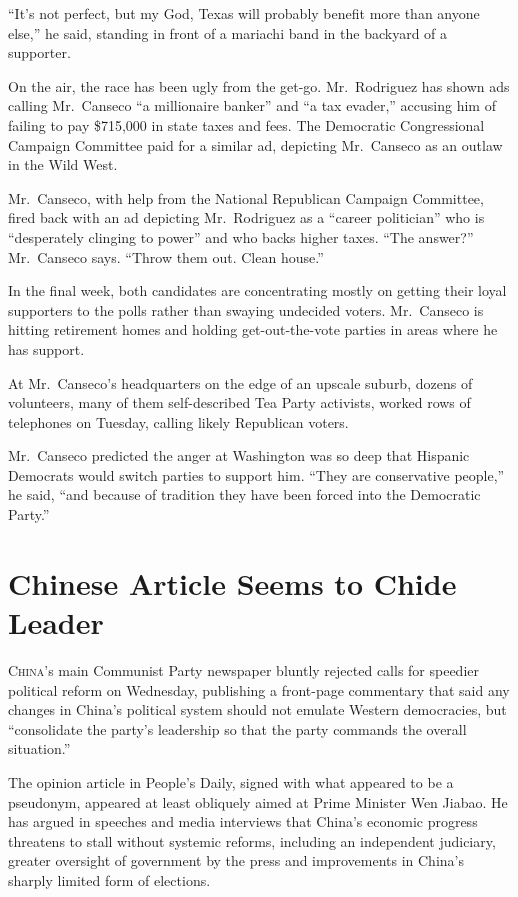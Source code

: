 ﻿\documentclass[12pt]{article}
\begin{document}
``It's not perfect, but my God, Texas will probably benefit more than anyone else,'' he said,
standing in front of a mariachi band in the backyard of a supporter.

On the air, the race has been ugly from the get-go. Mr.~Rodriguez has shown ads calling Mr.~Canseco
``a millionaire banker'' and ``a tax evader,'' accusing him of failing to pay \$715,000 in state
taxes and fees. The Democratic Congressional Campaign Committee paid for a similar ad, depicting
Mr.~Canseco as an outlaw in the Wild West.

Mr.~Canseco, with help from the National Republican Campaign Committee, fired back with an ad
depicting Mr.~Rodriguez as a ``career politician'' who is ``desperately clinging to power'' and who
backs higher taxes. ``The answer?'' Mr.~Canseco says. ``Throw them out. Clean house.''

In the final week, both candidates are concentrating mostly on getting their loyal supporters to the
polls rather than swaying undecided voters. Mr.~Canseco is hitting retirement homes and holding
get-out-the-vote parties in areas where he has support.

At Mr.~Canseco's headquarters on the edge of an upscale suburb, dozens of volunteers, many of them
self-described Tea Party activists, worked rows of telephones on Tuesday, calling likely Republican
voters.

Mr.~Canseco predicted the anger at Washington was so deep that Hispanic Democrats would switch
parties to support him. ``They are conservative people,'' he said, ``and because of tradition they
have been forced into the Democratic Party.''

\section{Chinese Article Seems to Chide Leader}

\lettrine{C}{hina}'s main Communist Party newspaper bluntly rejected calls
for speedier political reform on Wednesday, publishing a front-page commentary that said any changes
in China's political system should not emulate Western democracies, but ``consolidate the party's
leadership so that the party commands the overall situation.''

The opinion article in People's Daily, signed with what appeared to be a pseudonym, appeared at
least obliquely aimed at Prime Minister Wen Jiabao. He has argued in speeches and media interviews
that China's economic progress threatens to stall without systemic reforms, including an independent
judiciary, greater oversight of government by the press and improvements in China's sharply limited
form of elections.
\end{document}
